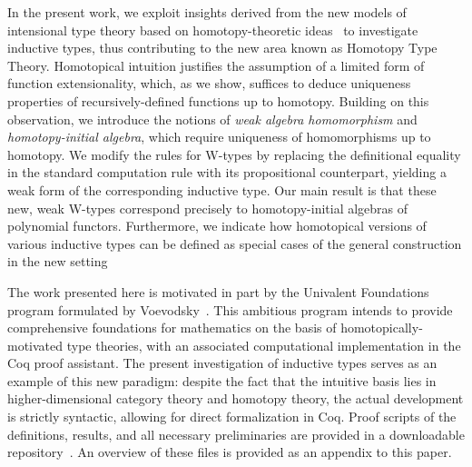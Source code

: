 \documentclass{article}
\theoremstyle{remark}
\theoremstyle{definition}
\begin{document}
 
In the present work, we exploit insights derived from the new models of intensional type theory based on 
homotopy-theoretic ideas~\cite{AwodeyS:homtmi,VoevodskyV:notts,vandenBergB:topsmi} to 
investigate inductive types, thus contributing to the new area known as Homotopy Type Theory.
Homotopical intuition justifies the assumption of a limited form of function extensionality, which, 
as we show, suffices to deduce uniqueness properties of recursively-defined functions up to  
homotopy.
Building on this observation, we introduce the notions of \emph{weak algebra homomorphism} and \emph
{homotopy-initial algebra}, which require uniqueness of homomorphisms up to homotopy. We modify the rules for W-types by replacing the definitional equality in the standard
computation rule with its propositional counterpart, yielding a weak form of the corresponding inductive type. 
Our main result is that these new, weak W-types correspond precisely to homotopy-initial algebras of 
polynomial functors.   Furthermore, we indicate how homotopical versions of various inductive types can be defined as special cases of the general construction in the new setting

The work presented here is motivated in part by the Univalent Foundations program formulated by 
Voevodsky~\cite{VoevodskyV:unifp}.  This ambitious program intends to provide comprehensive foundations for mathematics on the basis of homotopically-motivated type theories, with an associated computational implementation in the Coq proof assistant.  The present investigation of inductive types   serves as an example of this new paradigm: despite the fact that the intuitive basis lies in higher-dimensional category theory and homotopy theory, the actual development is strictly syntactic, allowing for direct formalization in Coq.  Proof scripts of the definitions, results, and all necessary preliminaries are provided in a downloadable repository~\cite{AwodeyS:indtht}. An overview of these files is provided as an appendix to this paper.
\end{document}
